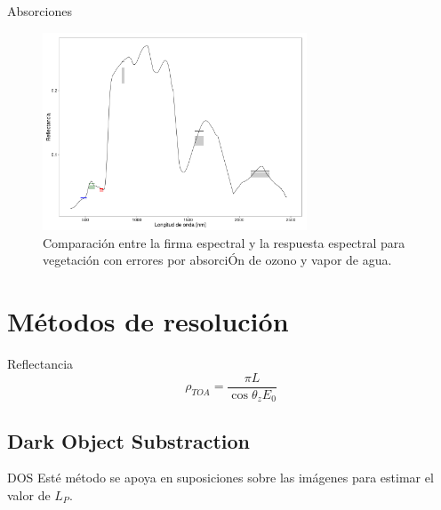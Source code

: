 \documentclass[handout]{beamer}
\begin{document}
\begin{frame}{Absorciones}
  \begin{figure}
  \centering
  \includegraphics[width=0.7\textwidth]{imagenes/abs_veg_esp.png}
  \caption{Comparación entre la firma espectral y la respuesta espectral para vegetación con errores por absorciÓn de ozono y vapor de agua.}
  \end{figure}
\end{frame}

\section{Métodos de resolución}
\begin{frame}{Reflectancia}
  \begin{equation}
    \rho_{TOA} = \frac{\pi L}{\cos \theta_z E_0}
  \end{equation}
\end{frame}

\subsection{Dark Object Substraction}
\begin{frame}{DOS}
  Esté método se apoya en suposiciones sobre las imágenes para estimar el valor de $L_P$.
\end{frame}
\end{document}

